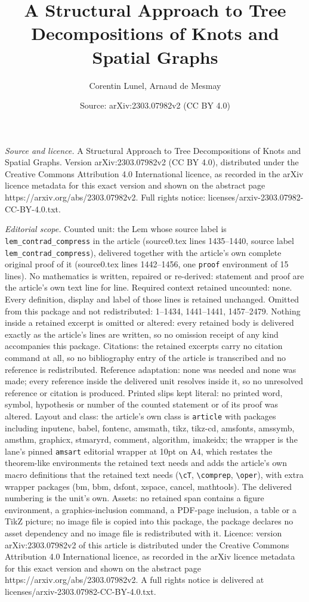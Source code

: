 \documentclass[10pt,a4paper]{amsart}
\title[A Structural Approach to Tree Decompositions of Knots and Sp]{A Structural Approach to Tree Decompositions of Knots and Spatial Graphs}
\author{Corentin Lunel, Arnaud de Mesmay}
\date{Source: arXiv:2303.07982v2 (CC BY 4.0)}
\begin{document}
\maketitle

\noindent\emph{Source and licence.} A Structural Approach to Tree Decompositions of Knots and Spatial Graphs. Version arXiv:2303.07982v2 (CC BY 4.0), distributed under the Creative Commons Attribution 4.0 International licence, as recorded in the arXiv licence metadata for this exact version and shown on the abstract page https://arxiv.org/abs/2303.07982v2. Full rights notice: licenses/arxiv-2303.07982-CC-BY-4.0.txt.\par\smallskip

\noindent\textit{Editorial scope.} Counted unit: the Lem whose source label is \texttt{lem\_contrad\_compress} in the article (source0.tex lines 1435--1440, source label \texttt{lem\_contrad\_compress}), delivered together with the article's own complete original proof of it (source0.tex lines 1442--1456, one \texttt{proof} environment of 15 lines). No mathematics is written, repaired or re-derived: statement and proof are the article's own text line for line. Required context retained uncounted: none. Every definition, display and label of those lines is retained unchanged. Omitted from this package and not redistributed: 1--1434, 1441--1441, 1457--2479. Nothing inside a retained excerpt is omitted or altered: every retained body is delivered exactly as the article's lines are written, so no omission receipt of any kind accompanies this package. Citations: the retained excerpts carry no citation command at all, so no bibliography entry of the article is transcribed and no reference is redistributed. Reference adaptation: none was needed and none was made; every reference inside the delivered unit resolves inside it, so no unresolved reference or citation is produced. Printed slips kept literal: no printed word, symbol, hypothesis or number of the counted statement or of its proof was altered. Layout and class: the article's own class is \texttt{article} with packages including inputenc, babel, fontenc, amsmath, tikz, tikz-cd, amsfonts, amssymb, amsthm, graphicx, stmaryrd, comment, algorithm, imakeidx; the wrapper is the lane's pinned \texttt{amsart} editorial wrapper at 10pt on A4, which restates the theorem-like environments the retained text needs and adds the article's own macro definitions that the retained text needs (\texttt{\textbackslash cT}, \texttt{\textbackslash comprep}, \texttt{\textbackslash oper}), with extra wrapper packages (bm, bbm, dsfont, xspace, cancel, mathtools). The delivered numbering is the unit's own. Assets: no retained span contains a figure environment, a graphics-inclusion command, a PDF-page inclusion, a table or a TikZ picture; no image file is copied into this package, the package declares no asset dependency and no image file is redistributed with it. Licence: version arXiv:2303.07982v2 of this article is distributed under the Creative Commons Attribution 4.0 International licence, as recorded in the arXiv licence metadata for this exact version and shown on the abstract page https://arxiv.org/abs/2303.07982v2. A full rights notice is delivered at licenses/arxiv-2303.07982-CC-BY-4.0.txt. 
\end{document}
